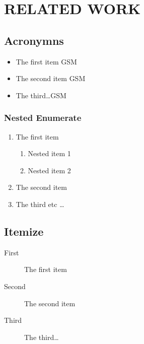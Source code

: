 \chapter{RELATED WORK} %
\section{Acronymns}
\lipsum[1]
\begin{itemize}
  \item The first item \acs{GSM}
  \item The second item \acs{GSM}
  \item The third\ldots \acs{GSM}
\end{itemize}
\subsection{Nested Enumerate}
\lipsum[1-2]
\begin{enumerate}
  \item The first item
  \begin{enumerate}
    \item Nested item 1
    \item Nested item 2
  \end{enumerate}
  \item The second item
  \item The third etc \ldots
\end{enumerate}
\lipsum[2]
\section{Itemize}

\begin{description}
  \item[First] The first item
  \item[Second] The second item
  \item[Third] The third\ldots
\end{description}
\lipsum[2-3]
